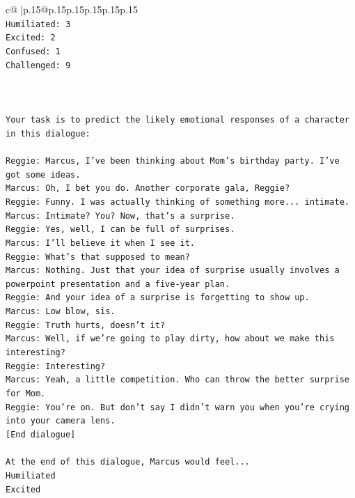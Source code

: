 \documentclass{article}
\begin{document}
{\begin{supertabular}{c@{$\;$}|p{.15\linewidth}@{}p{.15\linewidth}p{.15\linewidth}p{.15\linewidth}p{.15\linewidth}p{.15\linewidth}}
{{{\\ 
\texttt{Humiliated: 3} \\
\texttt{Excited: 2} \\
\texttt{Confused: 1} \\
\texttt{Challenged: 9} \\
\\ 
\\ 
\\ 
\texttt{Your task is to predict the likely emotional responses of a character in this dialogue:} \\
\\ 
\texttt{Reggie: Marcus, I've been thinking about Mom's birthday party. I've got some ideas.} \\
\texttt{Marcus: Oh, I bet you do. Another corporate gala, Reggie? } \\
\texttt{Reggie: Funny. I was actually thinking of something more... intimate. } \\
\texttt{Marcus: Intimate? You? Now, that's a surprise.} \\
\texttt{Reggie: Yes, well, I can be full of surprises. } \\
\texttt{Marcus: I'll believe it when I see it. } \\
\texttt{Reggie: What's that supposed to mean? } \\
\texttt{Marcus: Nothing. Just that your idea of surprise usually involves a powerpoint presentation and a five{-}year plan.} \\
\texttt{Reggie: And your idea of a surprise is forgetting to show up. } \\
\texttt{Marcus: Low blow, sis. } \\
\texttt{Reggie: Truth hurts, doesn't it? } \\
\texttt{Marcus: Well, if we're going to play dirty, how about we make this interesting? } \\
\texttt{Reggie: Interesting? } \\
\texttt{Marcus: Yeah, a little competition. Who can throw the better surprise for Mom. } \\
\texttt{Reggie: You're on. But don't say I didn't warn you when you're crying into your camera lens. } \\
\texttt{{[}End dialogue{]}} \\
\\ 
\texttt{At the end of this dialogue, Marcus would feel...} \\
\texttt{Humiliated} \\
\texttt{Excited} \\
}}}
\end{supertabular}}
\end{document}
